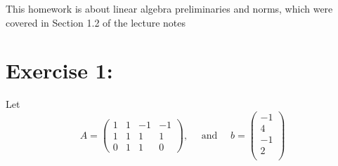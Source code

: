 \documentclass{article}
\begin{document}
\noindent This homework is about linear algebra preliminaries and norms, which were covered in Section 1.2 of the lecture notes

\section*{Exercise 1:}

Let
\begin{equation*}
    A = \left(
        \begin{array}{rrrr}
            1 & 1 & -1 & -1 \\
            1 & 1 & 1 & 1 \\
            0 & 1 & 1 & 0 
        \end{array}
    \right), \quad \text { and } \quad
    b = \left(
        \begin{array}{r}
            -1\\
            4\\
            -1\\
            2\\
        \end{array}
        \right)
\end{equation*}
\end{document}
